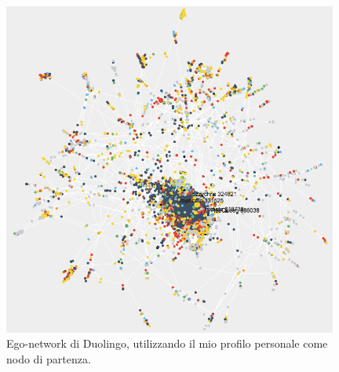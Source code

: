 \begin{figure}[bp!]
	\centering
	\includegraphics[width=110mm]{chapters/img/duograph.png}
	\caption{Ego-network di Duolingo, utilizzando il mio profilo personale come nodo di partenza. \label{overflow}}
\end{figure}
